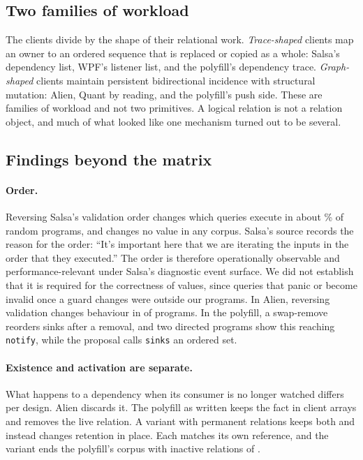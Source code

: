 \documentclass[11pt]{article}
\begin{document}
\subsection{Two families of workload}

The clients divide by the shape of their relational work. \emph{Trace-shaped} clients map an owner to an ordered sequence that is replaced or copied as a whole: Salsa's dependency list, WPF's listener list, and the polyfill's dependency trace. \emph{Graph-shaped} clients maintain persistent bidirectional incidence with structural mutation: Alien, Quant by reading, and the polyfill's push side. These are families of workload and not two primitives. A logical relation is not a relation object, and much of what looked like one mechanism turned out to be several.

\subsection{Findings beyond the matrix}

\paragraph{Order.} Reversing Salsa's validation order changes which queries execute in about \salsaReversePercent{}\% of random programs, and changes no value in any corpus. Salsa's source records the reason for the order: ``It's important here that we are iterating the inputs in the order that they executed.'' The order is therefore operationally observable and performance-relevant under Salsa's diagnostic event surface. We did not establish that it is required for the correctness of values, since queries that panic or become invalid once a guard changes were outside our programs. In Alien, reversing validation changes behaviour in \alienReverseValidate{} of \alienPrograms{} programs. In the polyfill, a swap-remove reorders sinks after a removal, and two directed programs show this reaching \texttt{notify}, while the proposal calls \texttt{sinks} an ordered set.

\paragraph{Existence and activation are separate.} What happens to a dependency when its consumer is no longer watched differs per design. Alien discards it. The polyfill as written keeps the fact in client arrays and removes the live relation. A variant with permanent relations keeps both and instead changes retention in place. Each matches its own reference, and the variant ends the polyfill's corpus with \polyfillRetainInactive{} inactive relations of \polyfillRetainPhysical{}.
\end{document}
